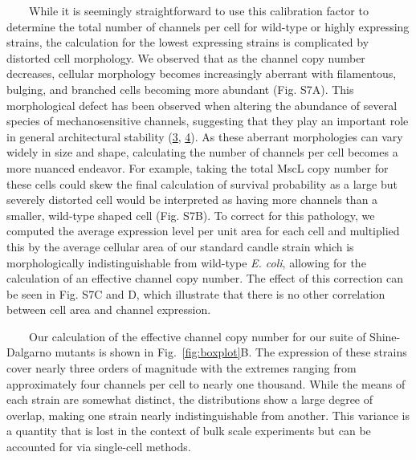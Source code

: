 ~~~~While
it is
seemingly
straightforward
to use
this
calibration
factor
to
determine
the
total
number
of
channels
per
cell
for
wild-type
or
highly
expressing
strains,
the
calculation
for
the
lowest
expressing
strains
is
complicated
by
distorted
cell
morphology.
We
observed
that
as the
channel
copy
number
decreases,
cellular
morphology
becomes
increasingly
aberrant
with
filamentous,
bulging,
and
branched
cells
becoming
more
abundant
(Fig.
S7A).
This
morphological
defect
has
been
observed
when
altering
the
abundance
of
several
species
of
mechanosensitive
channels,
suggesting
that
they
play
an
important
role
in
general
architectural
stability
(\protect\hyperlink{ref-bialecka-fornal2012}{3},
\protect\hyperlink{ref-bialecka-fornal2015}{4}).
As
these
aberrant
morphologies
can
vary
widely
in
size
and
shape,
calculating
the
number
of
channels
per
cell
becomes
a more
nuanced
endeavor.
For
example,
taking
the
total
MscL
copy
number
for
these
cells
could
skew
the
final
calculation
of
survival
probability
as a
large
but
severely
distorted
cell
would
be
interpreted
as
having
more
channels
than a
smaller,
wild-type
shaped
cell
(Fig.
S7B).
To
correct
for
this
pathology,
we
computed
the
average
expression
level
per
unit
area
for
each
cell
and
multiplied
this
by the
average
cellular
area
of our
standard
candle
strain
which
is
morphologically
indistinguishable
from
wild-type
\emph{E.
coli},
allowing
for
the
calculation
of an
effective
channel
copy
number.
The
effect
of
this
correction
can be
seen
in
Fig.
S7C
and D,
which
illustrate
that
there
is no
other
correlation
between
cell
area
and
channel
expression.

~~~~Our
calculation
of the
effective
channel
copy
number
for
our
suite
of
Shine-Dalgarno
mutants
is
shown
in
Fig.~\ref{fig:boxplot}B.
The
expression
of
these
strains
cover
nearly
three
orders
of
magnitude
with
the
extremes
ranging
from
approximately
four
channels
per
cell
to
nearly
one
thousand.
While
the
means
of
each
strain
are
somewhat
distinct,
the
distributions
show a
large
degree
of
overlap,
making
one
strain
nearly
indistinguishable
from
another.
This
variance
is a
quantity
that
is
lost
in the
context
of
bulk
scale
experiments
but
can be
accounted
for
via
single-cell
methods.

